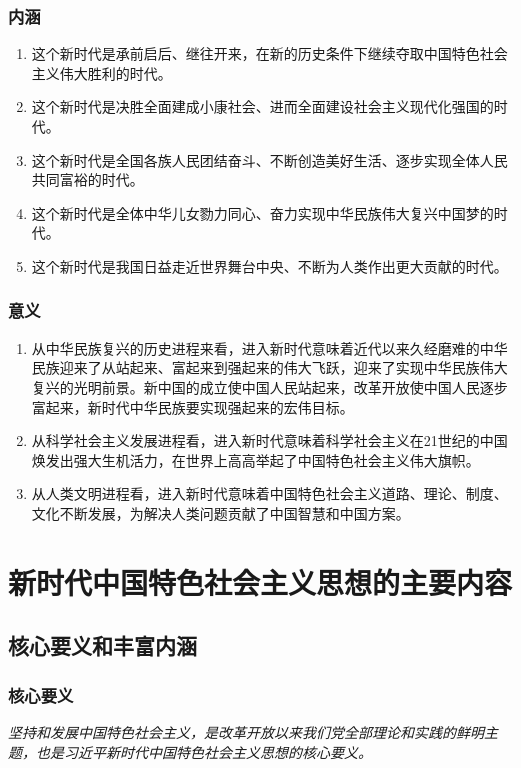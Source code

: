         \subsubsection{内涵}
        \begin{enumerate}
            \item 这个新时代是承前启后、继往开来，在新的历史条件下继续夺取中国特色社会主义伟大胜利的时代。
            \item 这个新时代是决胜全面建成小康社会、进而全面建设社会主义现代化强国的时代。
            \item 这个新时代是全国各族人民团结奋斗、不断创造美好生活、逐步实现全体人民共同富裕的时代。
            \item 这个新时代是全体中华儿女勠力同心、奋力实现中华民族伟大复兴中国梦的时代。
            \item 这个新时代是我国日益走近世界舞台中央、不断为人类作出更大贡献的时代。
        \end{enumerate}

        \subsubsection{意义}
        \begin{enumerate}
            \item 从中华民族复兴的历史进程来看，进入新时代意味着近代以来久经磨难的中华民族迎来了从站起来、富起来到强起来的伟大飞跃，迎来了实现中华民族伟大复兴的光明前景。新中国的成立使中国人民站起来，改革开放使中国人民逐步富起来，新时代中华民族要实现强起来的宏伟目标。
            \item 从科学社会主义发展进程看，进入新时代意味着科学社会主义在21世纪的中国焕发出强大生机活力，在世界上高高举起了中国特色社会主义伟大旗帜。
            \item 从人类文明进程看，进入新时代意味着中国特色社会主义道路、理论、制度、文化不断发展，为解决人类问题贡献了中国智慧和中国方案。
        \end{enumerate}


\section{新时代中国特色社会主义思想的主要内容}
    \subsection{核心要义和丰富内涵}
        \subsubsection{核心要义}
        \emph{坚持和发展中国特色社会主义，是改革开放以来我们党全部理论和实践的鲜明主题，也是习近平新时代中国特色社会主义思想的核心要义。}

